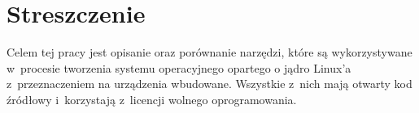 \documentclass[printmode]{mgr}
\begin{document}




%
%
%
%




















\listoffigures

\listoftables

\chapter*{Streszczenie}
Celem tej pracy jest opisanie oraz porównanie narzędzi, które są wykorzystywane w~procesie tworzenia systemu operacyjnego opartego o jądro Linux'a z~przeznaczeniem na urządzenia wbudowane.
Wszystkie z~nich mają otwarty kod źródłowy i~korzystają z~licencji wolnego oprogramowania.
\end{document}
